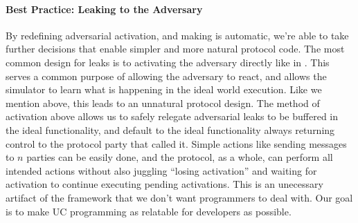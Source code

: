 %


\paragraph{Best Practice: Leaking to the Adversary}
By redefining adversarial activation, and making is automatic, we're able to take further decisions that enable simpler and more natural protocol code.
The most common design for leaks is to activating the adversary directly like in \Fchan. 
This serves a common purpose of allowing the adversary to react, and allows the simulator to learn what is happening in the ideal world execution.
Like we mention above, this leads to an unnatural protocol design.
The method of activation above allows us to safely relegate adversarial leaks to be buffered in the ideal functionality, and default to the ideal functionality always returning control to the protocol party that called it.
Simple actions like sending messages to $n$ parties can be easily done, and the protocol, as a whole, can perform all intended actions without also juggling ``losing activation'' and waiting for activation to continue executing pending activations.
This is an unecessary artifact of the framework that we don't want programmers to deal with. 
Our goal is to make UC programming as relatable for developers as possible.


